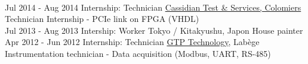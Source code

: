 \documentclass[letterpaper]{twentysecondcv} %
\begin{document}
\begin{twenty}
{\begin{itemize}
    \end{itemize}
  }
  \\
  \twentyitem
  {Jul 2014 -}
  {Aug 2014}
  {Internship: Technician}
  {\href{http://www.spherea.com/en}{Cassidian Test \& Services, Colomiers}}
  {
    Technician Internship - PCIe link on FPGA (VHDL)
  }
  \\
  \twentyitem
  {Jul 2013 -}
  {Aug 2013}
  {Intership: Worker}
  {Tokyo / Kitakyushu, Japon}
  {
    House painter
  }
  \\
  \twentyitem
  {Apr 2012 -}
  {Jun 2012}
  {Internship: Technician}  
  {\href{https://www.gtptech.com/}{GTP Technology}, Labège}
  {
    Instrumentation technician - Data acquisition (Modbus, UART, RS-485)
  }  
\end{twenty}
\end{document}
